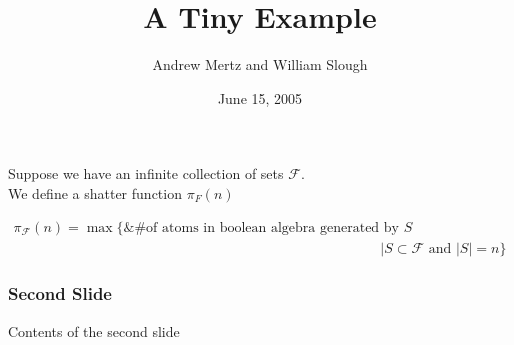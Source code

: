 \documentclass{beamer}
\title{A Tiny Example}
\author{Andrew Mertz and William Slough}
\date{June 15, 2005}
\newcommand{\F}{\mathcal F}
\begin{document}
\maketitle

\begin{frame}
	Suppose we have an infinite collection of sets $\F$. \\
	We define a shatter function $\pi_F(n)$

	\begin{align*}
		\pi_\F(n) = \max \{ \text {&\# of atoms in boolean algebra generated by $S$} \\
		            &\mid S \subset \F \text{ and } |S| = n\}
	\end{align*}
\end{frame}

\begin{frame}
	\frametitle{Second Slide}
	Contents of the second slide
\end{frame}
\end{document}
